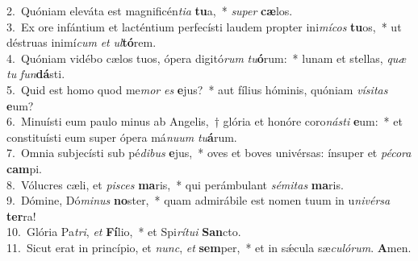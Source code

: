 {2.~}Quóniam eleváta est magnificén\textit{ti}\textit{a} \textbf{tu}a,~* \textit{su}\textit{per} \textbf{cæ}los.\\
{3.~}Ex ore infántium et lacténtium perfecísti laudem propter ini\textit{mí}\textit{cos} \textbf{tu}os,~* ut déstruas inimí\textit{cum} \textit{et} \textit{ul}\textbf{tó}rem.\\
{4.~}Quóniam vidébo cælos tuos, ópera digitó\textit{rum} \textit{tu}\textbf{ó}rum:~* lunam et stellas, \textit{quæ} \textit{tu} \textit{fun}\textbf{dá}sti.\\
{5.~}Quid est homo quod me\textit{mor} \textit{es} \textbf{e}jus?~* aut fílius hóminis, quóniam \textit{ví}\textit{si}\textit{tas} \textbf{e}um?\\
{6.~}Minuísti eum paulo minus ab Angelis,~† glória et honóre coro\textit{ná}\textit{sti} \textbf{e}um:~* et constituísti eum super ópera má\textit{nu}\textit{um} \textit{tu}\textbf{á}rum.\\
{7.~}Omnia subjecísti sub pé\textit{di}\textit{bus} \textbf{e}jus,~* oves et boves univérsas: ínsuper et \textit{pé}\textit{co}\textit{ra} \textbf{cam}pi.\\
{8.~}Vólucres cæli, et \textit{pi}\textit{sces} \textbf{ma}ris,~* qui perámbulant \textit{sé}\textit{mi}\textit{tas} \textbf{ma}ris.\\
{9.~}Dómine, Dó\textit{mi}\textit{nus} \textbf{no}ster,~* quam admirábile est nomen tuum in u\textit{ni}\textit{vér}\textit{sa} \textbf{ter}ra!\\
{10.~}Glória Pa\textit{tri}, \textit{et} \textbf{Fí}lio,~* et Spi\textit{rí}\textit{tu}\textit{i} \textbf{San}cto.\\
{11.~}Sicut erat in princípio, et \textit{nunc}, \textit{et} \textbf{sem}per,~* et in sǽcula sæ\textit{cu}\textit{ló}\textit{rum}. \textbf{A}men.\\
